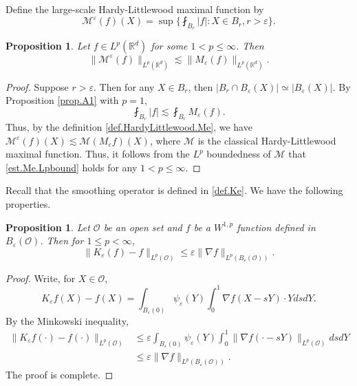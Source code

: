 \documentclass[reqno,12pt]{amsart} %
\newtheorem{proposition}[theorem]{Proposition}
\theoremstyle{definition}
\theoremstyle{remark}
\numberwithin{equation}{section}
\newcommand{\M}{\mathcal{M}}
\newcommand{\R}{\mathbb{R}}
\newcommand{\e}{\varepsilon}
\begin{document}
Define the large-scale Hardy-Littlewood maximal function by
\begin{equation}\label{def.HardyLittlewood.Me}
    \M^\e(f)(X) = \sup\bigg\{ \fint_{B_r} |f|: X\in B_r, r> \e \bigg\}.
\end{equation}
\begin{proposition}\label{prop.LS.HLM}
    Let $f \in L^p(\R^d)$ for some $1<p\le \infty$. Then
    \begin{equation}\label{est.Me.Lpbound}
        \| \M^\e(f) \|_{L^p(\R^d)} \lesssim \| M_\e(f) \|_{L^p(\R^d)}.
    \end{equation}
\end{proposition}
\begin{proof}
    Suppose $r>\e$. Then for any $X\in B_r$, then $|B_r \cap B_\e(X)| \simeq |B_\e(X)|$. By Proposition \ref{prop.A1} with $p = 1$,
    \begin{equation}
        \fint_{B_r} |f| \lesssim \fint_{B_r} M_\e(f).
    \end{equation}
    Thus, by the definition \eqref{def.HardyLittlewood.Me},  we have $\M^\e(f)(X) \lesssim \M (M_\e f)(X)$, where $\M$ is the classical Hardy-Littlewood maximal function. Thus, it follows from the $L^p$ boundedness of $\M$ that \eqref{est.Me.Lpbound} holds for any $1<p\le \infty$.
\end{proof}

Recall that the smoothing operator is defined in \eqref{def.Ke}. We have the following properties.

\begin{proposition}\label{prop.f-Kef}
    Let $\mathcal{O}$ be an open set and  $f$ be  a $W^{1,p}$ function defined in $B_{\e}(\mathcal{O})$. Then for $1\le p<\infty$,
    \begin{equation}
        \| K_\e(f) - f \|_{L^p(\mathcal{O})} \le \e \| \nabla f \|_{L^p(B_\e(\mathcal{O}))}.
    \end{equation}
\end{proposition}
\begin{proof}
    Write, for $X\in \mathcal{O}$,
    \begin{equation}
        K_\e f(X)  - f(X) = \int_{B_\e(0)} \psi_\e(Y) \int_0^1 \nabla f(X - sY) \cdot Y ds dY.
    \end{equation}
    By the Minkowski inequality,
    \begin{equation}
    \begin{aligned}
        \| K_\e f(\cdot)  - f(\cdot) \|_{L^p(\mathcal{O})} & \le \e \int_{B_\e(0)} \psi_\e(Y) \int_0^1 \| \nabla f(\cdot - sY) \|_{L^p(\mathcal{O})}  ds dY \\
        & \le \e \| \nabla f \|_{L^p(B_\e(\mathcal{O}))}.
    \end{aligned}
    \end{equation}
    The proof is complete.
\end{proof}
\end{document}
